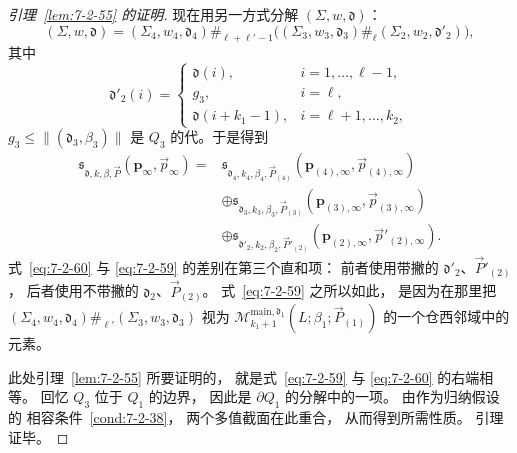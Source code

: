 \begin{proof}[引理~\ref{lem:7-2-55} 的证明]
现在用另一方式分解 $(\Sigma,w,\mathfrak d)$：
\[
(\Sigma,w,\mathfrak d)
=(\Sigma_4,w_4,\mathfrak d_4)
\mathbin{\#_{\ell+\ell'-1}}
\bigl((\Sigma_3,w_3,\mathfrak d_3)
\mathbin{\#_\ell}
(\Sigma_2,w_2,\mathfrak d'_2)\bigr),
\]
其中
\[
\mathfrak d'_2(i)=
\begin{cases}
\mathfrak d(i),&i=1,\ldots,\ell-1,\\
g_3,&i=\ell,\\
\mathfrak d(i+k_1-1),&i=\ell+1,\ldots,k_2,
\end{cases}
\]
$g_3\le\|(\mathfrak d_3,\beta_3)\|$
是 $Q_3$ 的代。于是得到
\begin{equation}
\begin{aligned}
\mathfrak s_{\mathfrak d,k,\beta,\vec P}
(\mathbf p_\infty,\vec p_\infty)
={}&\mathfrak s_{\mathfrak d_4,k_4,\beta_4,\vec P_{(4)}}
(\mathbf p_{(4),\infty},\vec p_{(4),\infty})\\
&\oplus
\mathfrak s_{\mathfrak d_3,k_3,\beta_3,\vec P_{(3)}}
(\mathbf p_{(3),\infty},\vec p_{(3),\infty})\\
&\oplus
\mathfrak s_{\mathfrak d'_2,k_2,\beta_2,\vec P'_{(2)}}
(\mathbf p_{(2),\infty},\vec p'_{(2),\infty}).
\end{aligned}
\tag{7.2.60}\label{eq:7-2-60}
\end{equation}
式~\eqref{eq:7-2-60} 与
\eqref{eq:7-2-59} 的差别在第三个直和项：
前者使用带撇的
$\mathfrak d'_2$、$\vec P'_{(2)}$，
后者使用不带撇的
$\mathfrak d_2$、$\vec P_{(2)}$。
式~\eqref{eq:7-2-59} 之所以如此，
是因为在那里把
$(\Sigma_4,w_4,\mathfrak d_4)
\mathbin{\#_{\ell'}}
(\Sigma_3,w_3,\mathfrak d_3)$
视为
$\mathcal M^{\mathrm{main},\mathfrak d_1}_{k_1+1}
(L;\beta_1;\vec P_{(1)})$
的一个仓西邻域中的元素。

此处引理~\ref{lem:7-2-55} 所要证明的，
就是式~\eqref{eq:7-2-59} 与
\eqref{eq:7-2-60} 的右端相等。
回忆 $Q_3$ 位于 $Q_1$ 的边界，
因此是 $\partial Q_1$ 的分解中的一项。
由作为归纳假设的
相容条件~\ref{cond:7-2-38}，
两个多值截面在此重合，
从而得到所需性质。
引理证毕。
\end{proof}
